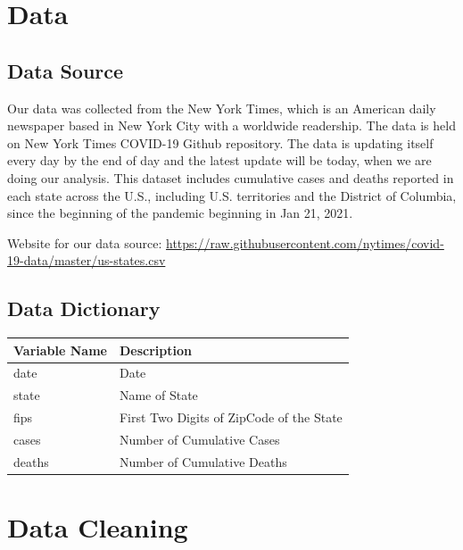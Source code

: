 \documentclass[
]{book}
\begin{document}
\hypertarget{data}{%
\chapter{Data}\label{data}}

\hypertarget{data-source}{%
\section{Data Source}\label{data-source}}

Our data was collected from the New York Times, which is an American daily newspaper based in New York City with a worldwide readership. The data is held on New York Times COVID-19 Github repository. The data is updating itself every day by the end of day and the latest update will be today, when we are doing our analysis. This dataset includes cumulative cases and deaths reported in each state across the U.S., including U.S. territories and the District of Columbia, since the beginning of the pandemic beginning in Jan 21, 2021.

Website for our data source: \url{https://raw.githubusercontent.com/nytimes/covid-19-data/master/us-states.csv}

\hypertarget{data-dictionary}{%
\section{Data Dictionary}\label{data-dictionary}}

\begin{longtable}[]{@{}ll@{}}
\toprule
Variable Name & Description \\
\midrule
\endhead
date & Date \\
state & Name of State \\
fips & First Two Digits of ZipCode of the State \\
cases & Number of Cumulative Cases \\
deaths & Number of Cumulative Deaths \\
\bottomrule
\end{longtable}

\hypertarget{data-cleaning}{%
\chapter{Data Cleaning}\label{data-cleaning}}
\end{document}
